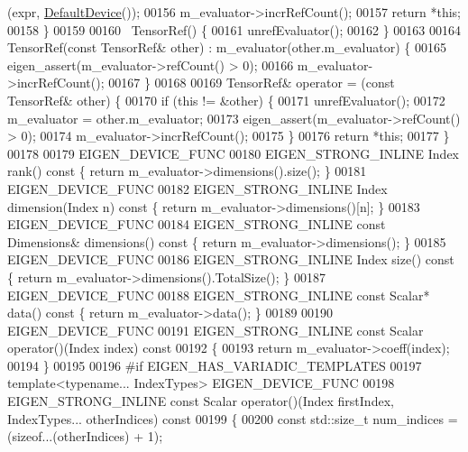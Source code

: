 \begin{DoxyCode}
      (expr, \hyperlink{struct_eigen_1_1_default_device}{DefaultDevice}());
00156       m\_evaluator->incrRefCount();
00157       \textcolor{keywordflow}{return} *\textcolor{keyword}{this};
00158     \}
00159 
00160     ~TensorRef() \{
00161       unrefEvaluator();
00162     \}
00163 
00164     TensorRef(\textcolor{keyword}{const} TensorRef& other) : m\_evaluator(other.m\_evaluator) \{
00165       eigen\_assert(m\_evaluator->refCount() > 0);
00166       m\_evaluator->incrRefCount();
00167     \}
00168 
00169     TensorRef& operator = (\textcolor{keyword}{const} TensorRef& other) \{
00170       \textcolor{keywordflow}{if} (\textcolor{keyword}{this} != &other) \{
00171         unrefEvaluator();
00172         m\_evaluator = other.m\_evaluator;
00173         eigen\_assert(m\_evaluator->refCount() > 0);
00174         m\_evaluator->incrRefCount();
00175       \}
00176       \textcolor{keywordflow}{return} *\textcolor{keyword}{this};
00177     \}
00178 
00179     EIGEN\_DEVICE\_FUNC
00180     EIGEN\_STRONG\_INLINE Index rank()\textcolor{keyword}{ const }\{ \textcolor{keywordflow}{return} m\_evaluator->dimensions().size(); \}
00181     EIGEN\_DEVICE\_FUNC
00182     EIGEN\_STRONG\_INLINE Index dimension(Index n)\textcolor{keyword}{ const }\{ \textcolor{keywordflow}{return} m\_evaluator->dimensions()[n]; \}
00183     EIGEN\_DEVICE\_FUNC
00184     EIGEN\_STRONG\_INLINE \textcolor{keyword}{const} Dimensions& dimensions()\textcolor{keyword}{ const }\{ \textcolor{keywordflow}{return} m\_evaluator->dimensions(); \}
00185     EIGEN\_DEVICE\_FUNC
00186     EIGEN\_STRONG\_INLINE Index size()\textcolor{keyword}{ const }\{ \textcolor{keywordflow}{return} m\_evaluator->dimensions().TotalSize(); \}
00187     EIGEN\_DEVICE\_FUNC
00188     EIGEN\_STRONG\_INLINE \textcolor{keyword}{const} Scalar* data()\textcolor{keyword}{ const }\{ \textcolor{keywordflow}{return} m\_evaluator->data(); \}
00189 
00190     EIGEN\_DEVICE\_FUNC
00191     EIGEN\_STRONG\_INLINE \textcolor{keyword}{const} Scalar operator()(Index index)\textcolor{keyword}{ const}
00192 \textcolor{keyword}{    }\{
00193       \textcolor{keywordflow}{return} m\_evaluator->coeff(index);
00194     \}
00195 
00196 \textcolor{preprocessor}{#if EIGEN\_HAS\_VARIADIC\_TEMPLATES}
00197     \textcolor{keyword}{template}<\textcolor{keyword}{typename}... IndexTypes> EIGEN\_DEVICE\_FUNC
00198     EIGEN\_STRONG\_INLINE \textcolor{keyword}{const} Scalar operator()(Index firstIndex, IndexTypes... otherIndices)\textcolor{keyword}{ const}
00199 \textcolor{keyword}{    }\{
00200       \textcolor{keyword}{const} std::size\_t num\_indices = (\textcolor{keyword}{sizeof}...(otherIndices) + 1);

\end{DoxyCode}

